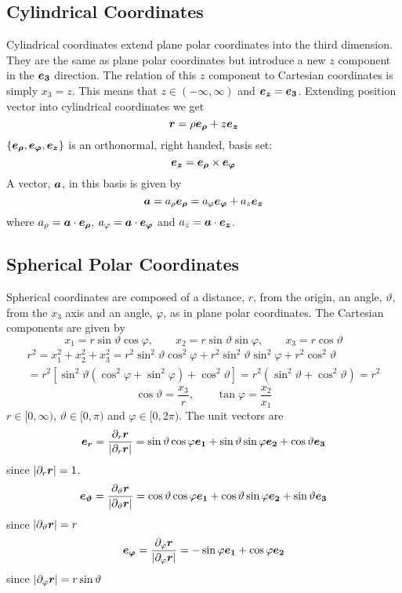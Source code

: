 \documentclass{article}
\begin{document}
    \subsection{Cylindrical Coordinates}
    Cylindrical coordinates extend plane polar coordinates into the third dimension.
    They are the same as plane polar coordinates but introduce a new \(z\) component in the \(\bm{e_{3}}\) direction.
    The relation of this \(z\) component to Cartesian coordinates is simply \(x_3 = z\).
    This means that \(z\in(-\infty, \infty)\) and \(\bm{e_{z}} = \bm{e_{3}}\).
    Extending position vector into cylindrical coordinates we get
    \[\bm{r} = \rho\bm{e_{\rho}} + z\bm{e_{z}}\]
    \(\{\bm{e_{\rho}}, \bm{e_{\varphi}}, \bm{e_{z}}\}\) is an orthonormal, right handed, basis set:
    \[\bm{e_{z}} = \bm{e_{\rho}}\times\bm{e_{\varphi}}\]
    A vector, \(\bm{a}\), in this basis is given by
    \[\bm{a} = a_\rho\bm{e_{\rho}} = a_\varphi\bm{e_{\varphi}} + a_z\bm{e_{z}}\]
    where \(a_\rho = \bm{a}\cdot\bm{e_{\rho}}\), \(a_\varphi = \bm{a}\cdot\bm{e_{\varphi}}\) and \(a_z = \bm{a}\cdot\bm{e_{z}}\).
    
    \subsection{Spherical Polar Coordinates}
    Spherical coordinates are composed of a distance, \(r\), from the origin, an angle, \(\vartheta\), from the \(x_3\) axis and an angle, \(\varphi\), as in plane polar coordinates.
    The Cartesian components are given by
    \[x_1 = r\sin\vartheta\cos\varphi, \qquad x_2 = r\sin\vartheta\sin\varphi, \qquad x_3 = r\cos\vartheta\]
    \begin{multline*}
    r^2 = x_1^2 + x_2^2 + x_3^2 = r^2\sin^2\vartheta\cos^2\varphi + r^2\sin^2\vartheta\sin^2\varphi + r^2\cos^2\vartheta \\= r^2[\sin^2\vartheta(\cos^2\varphi + \sin^2\varphi) + \cos^2\vartheta] = r^2(\sin^2\vartheta + \cos^2\vartheta) = r^2
    \end{multline*}
    \[\cos\vartheta = \frac{x_3}{r},\qquad \tan\varphi = \frac{x_2}{x_1}\]
    \(r\in[0, \infty)\), \(\vartheta\in[0, \pi)\) and \(\varphi\in[0, 2\pi)\).
    The unit vectors are
    \[\bm{e_{r}} = \frac{\partial_r\bm{r}}{|\partial_r\bm{r}|} = \sin\vartheta\cos\varphi\bm{e_{1}} + \sin\vartheta\sin\varphi\bm{e_{2}} + \cos\vartheta\bm{e_{3}}\]
    since \(|\partial_r\bm{r}| = 1\).
    \[\bm{e_{\vartheta}} = \frac{\partial_\vartheta\bm{r}}{|\partial_\vartheta\bm{r}|} = \cos\vartheta\cos\varphi\bm{e_{1}} + \cos\vartheta\sin\varphi\bm{e_{2}} + \sin\vartheta\bm{e_{3}}\]
    since \(|\partial_\vartheta\bm{r}| = r\)
    \[\bm{e_{\varphi}} = \frac{\partial_\varphi\bm{r}}{|\partial_\varphi\bm{r}|} = -\sin\varphi\bm{e_{1}} + \cos\varphi\bm{e_{2}}\]
    since \(|\partial_\varphi\bm{r}| = r\sin\vartheta\)
    
\end{document}
